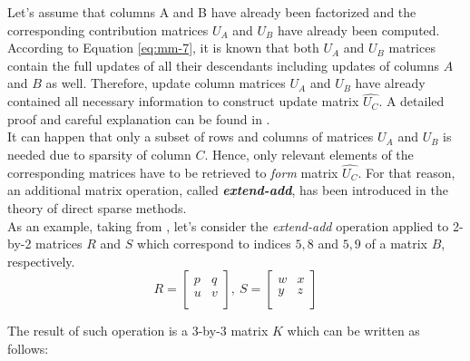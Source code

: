 Let's assume that columns A and B have already been factorized and the corresponding contribution matrices $U_{A}$ and $U_{B}$ have already been computed. According to Equation \ref{eq:mm-7}, it is known that both $U_{A}$ and $U_{B}$ matrices contain the full updates of all their descendants including updates of columns $A$ and $B$ as well. Therefore, update column matrices $U_{A}$ and $U_{B}$ have already contained all necessary information to construct update matrix $\hat{U_{C}}$. A detailed proof and careful explanation can be found in \cite{mult-frontal-original:2}.\\


It can happen that only a subset of rows and columns of matrices $U_{A}$ and $U_{B}$ is needed due to sparsity of column $C$. Hence, only relevant elements of the corresponding matrices have to be retrieved to \textit{form} matrix $\hat{U_{C}}$. For that reason, an additional matrix operation, called \textbf{\textit{extend-add}}, has been introduced in the theory of direct sparse methods.\\



As an example, taking from \cite{mult-frontal-original:2}, let's consider the \textit{extend-add} operation applied to 2-by-2 matrices $R$ and $S$ which correspond to indices ${5,8}$ and ${5,9}$ of a matrix $B$, respectively.\\

\begin{equation}
R = \begin{bmatrix}
p & q \\
u & v \\
\end{bmatrix} 
,
\:
S = \begin{bmatrix}
w & x \\
y & z \\
\end{bmatrix} 
\end{equation}

The result of such operation is a 3-by-3 matrix $K$ which can be written as follows:\\

